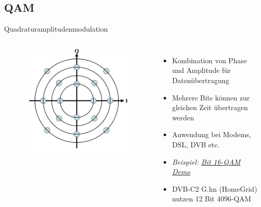 \subsection{QAM}
\begin{frame}{Quadraturamplitudenmodulation}
  \begin{columns}
    \begin{figure}
      \includegraphics[width=\textwidth,height=.7\textheight,keepaspectratio]{a15/Circular_16QAM.png}
    \end{figure}
    \begin{itemize}
      \item Kombination von Phase und Amplitude für Datenübertragung
      \item Mehrere Bits können zur gleichen Zeit übertragen werden
      \item Anwendung bei Modems, DSL, DVB etc.
      \item \emph{Beispiel: \href{https://upload.wikimedia.org/wikipedia/commons/9/90/QAM16_Demonstration.gif}{ Bit 16-QAM Demo}}
      \item DVB-C2 G.hn (HomeGrid) nutzen 12 Bit 4096-QAM
    \end{itemize}
  \end{columns}
\end{frame}


